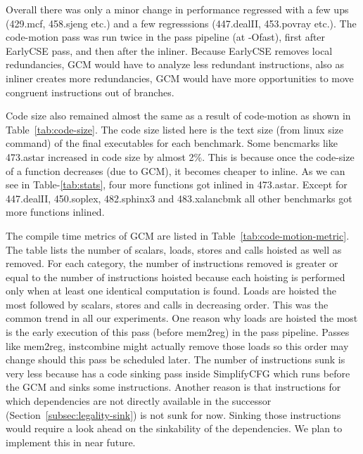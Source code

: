 \documentclass[acmlarge,review,anonymous]{acmart}\settopmatter{printfolios=true}
\begin{document}
Overall there was only a minor change in performance regressed with a few ups
(429.mcf, 458.sjeng etc.) and a few regresssions (447.dealII, 453.povray
etc.). The code-motion pass was run twice in the pass pipeline (at -Ofast),
first after EarlyCSE pass, and then after the inliner. Because EarlyCSE removes
local redundancies, GCM would have to analyze less redundant instructions, also
as inliner creates more redundancies, GCM would have more opportunities to move
congruent instructions out of branches.

Code size also remained almost the same as a result of code-motion as shown in
Table~\ref{tab:code-size}.  The code size listed here is the text size (from
linux size command) of the final executables for each benchmark.  Some bencmarks
like 473.astar increased in code size by almost 2\%. This is because once the
code-size of a function decreases (due to GCM), it becomes cheaper to inline. As
we can see in Table-\ref{tab:stats}, four more functions got inlined in
473.astar. Except for 447.dealII, 450.soplex, 482.sphinx3 and 483.xalancbmk all
other benchmarks got more functions inlined.

The compile time metrics of GCM are listed in
Table~\ref{tab:code-motion-metric}. The table lists the number of scalars,
loads, stores and calls hoisted as well as removed. For each category, the
number of instructions removed is greater or equal to the number of instructions
hoisted because each hoisting is performed only when at least one identical
computation is found. Loads are hoisted the most followed by scalars, stores and
calls in decreasing order.  This was the common trend in all our
experiments. One reason why loads are hoisted the most is the early execution of
this pass (before mem2reg) in the \LLVM{} pass pipeline. Passes like mem2reg,
instcombine might actually remove those loads so this order may change should
this pass be scheduled later. The number of instructions sunk is very less
because \LLVM{} has a code sinking pass inside SimplifyCFG which runs before the
GCM and sinks some instructions. Another reason is that instructions for which
dependencies are not directly available in the successor
(Section~\ref{subsec:legality-sink}) is not sunk for now. Sinking those
instructions would require a look ahead on the sinkability of the
dependencies. We plan to implement this in near future.
\end{document}
